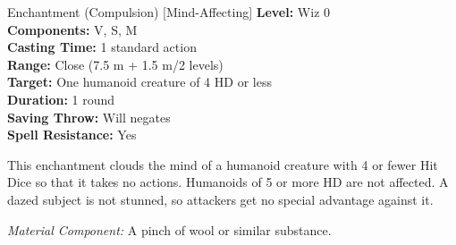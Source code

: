 {Enchantment (Compulsion) [Mind-Affecting]}
{
	\textbf{Level:}
	Wiz 0\\
	\textbf{Components:}
	V, S, M\\
	\textbf{Casting Time:}
	1 standard action\\
	\textbf{Range:}
	Close (7.5 m + 1.5 m/2 levels)\\
	\textbf{Target:}
	One humanoid creature of 4 HD or less\\
	\textbf{Duration:}
	1 round\\
	\textbf{Saving Throw:}
	Will negates\\
	\textbf{Spell Resistance:}
	Yes\\
}
{
	This enchantment clouds the mind of a humanoid creature with 4 or fewer Hit Dice so that it takes no actions. Humanoids of 5 or more HD are not affected. A dazed subject is not stunned, so attackers get no special advantage against it.

	\textit{Material Component:}
	A pinch of wool or similar substance.

}
